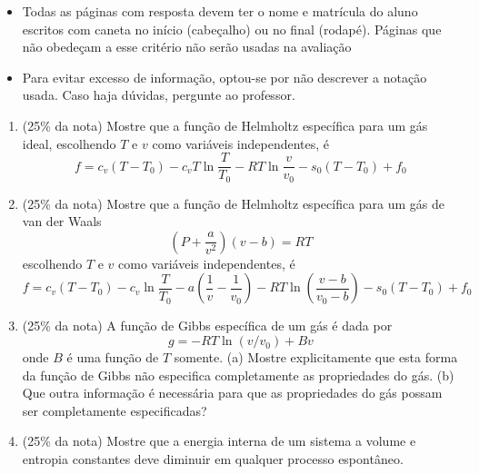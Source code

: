 \documentclass[12pt,a4paper,brazilian]{article}
\newcommand{\ratio}[1]{(#1\% da nota)}
\begin{document}
\begin{tcolorbox}[colback=black!10, colframe=black!50, title=Observações]
    \begin{itemize}
        \item Todas as páginas com resposta devem ter o nome e matrícula do
            aluno escritos com caneta no início (cabeçalho) ou no final
            (rodapé). Páginas que não obedeçam a esse critério não serão usadas
            na avaliação

        \item Para evitar excesso de informação, optou-se por não
            descrever a notação usada. Caso haja
            dúvidas, pergunte ao professor.
    \end{itemize}
\end{tcolorbox}

\vspace{2em}

\begin{enumerate}
    \item \ratio{25} Mostre que a função de Helmholtz específica para um gás ideal, escolhendo 
        \(T\) e \(v\) como variáveis independentes, é
        \[
            f=c_v(T-T_0) -c_v T \ln \frac{T}{T_0} - 
            RT\ln\frac{v}{v_0}-s_0(T-T_0) + f_0
        \]

    \item \ratio{25} Mostre que a função de Helmholtz específica para um gás de van der Waals
        \[
            \left(P+\frac{a}{v^2}\right)(v-b)=RT
        \]
        escolhendo \(T\) e \(v\) como variáveis independentes, é
        \[
            f=c_v (T-T_0) - c_v \ln \frac{T}{T_0} - a\left(\frac{1}{v}-
            \frac{1}{v_0}\right)-
            RT\ln\left(\frac{v-b}{v_0-b}\right)-s_0(T-T_0)+f_0
        \]

    \item \ratio{25} A função de Gibbs específica de um gás é dada por
        \[
            g = -RT\ln(v/v_0) + Bv
        \]
        onde \(B\) é uma função de \(T\) somente. (a) Mostre explicitamente
        que esta forma da função de Gibbs não especifica completamente as 
        propriedades do gás. (b) Que outra informação é necessária para que as 
        propriedades do gás possam ser completamente especificadas?

    \item \ratio{25} Mostre que a energia interna de um sistema a volume e entropia
        constantes deve  diminuir em qualquer processo espontâneo.

\end{enumerate}
\end{document}
